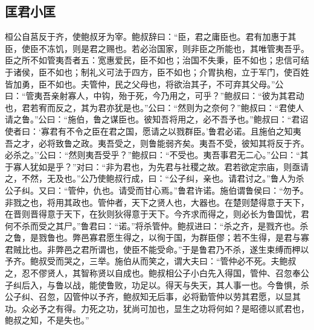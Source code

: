 \documentclass[]{article}
\begin{document}
\hypertarget{header-n340}{%
\subsection{匡君小匡}\label{header-n340}}

桓公自莒反于齐，使鲍叔牙为宰。鲍叔辞曰：``臣，君之庸臣也。君有加惠于其臣，使臣不冻饥，则是君之赐也。若必治国家，则非臣之所能也，其唯管夷吾乎。臣之所不如管夷吾者五：宽惠爱民，臣不如也；治国不失秉，臣不如也；忠信可结于诸侯，臣不如也；制礼义可法于四方，臣不如也；介胃执枹，立于军门，使百姓皆加勇，臣不如也。夫管仲，民之父母也，将欲治其子，不可弃其父母。''公曰：``管夷吾亲射寡人，中钩，殆于死，今乃用之，可乎？''鲍叔曰：``彼为其君动也，君若宥而反之，其为君亦犹是也。''公曰：``然则为之奈何？''鲍叔曰：``君使人请之鲁。''公曰：``施伯，鲁之谋臣也。彼知吾将用之，必不吾予也。''鲍叔曰：``君诏使者曰：`寡君有不令之臣在君之国，愿请之以戮群臣。'鲁君必诺。且施伯之知夷吾之才，必将致鲁之政。夷吾受之，则鲁能弱齐矣。夷吾不受，彼知其将反于齐。必杀之。''公曰：``然则夷吾受乎？''鲍叔曰：``不受也。夷吾事君无二心。''公曰：``其于寡人犹如是乎？''对曰：``非为君也，为先君与社稷之故。君若欲定宗庙，则亟请之，不然，无及也。''公乃使鲍叔行成，曰：``公子纠，亲也。请君讨之。''鲁人为杀公子纠。又曰：``管仲，仇也。请受而甘心焉。''鲁君许诺。施伯谓鲁侯曰：``勿予。非戮之也，将用其政也。管仲者，天下之贤人也，大器也。在楚则楚得意于天下，在晋则晋得意于天下，在狄则狄得意于天下。今齐求而得之，则必长为鲁国忧，君何不杀而受之其尸。''鲁君曰：``诺。''将杀管仲。鲍叔进曰：``杀之齐，是戮齐也。杀之鲁，是戮鲁也。弊邑寡君愿生得之，以徇于国，为群臣僇；若不生得，是君与寡君贼比也。非弊邑之君所谓也，使臣不能受命。''于是鲁君乃不杀，遂生束缚而柙以予齐。鲍叔受而哭之，三举。施伯从而笑之，谓大夫曰：``管仲必不死。夫鲍叔之，忍不僇贤人，其智称贤以自成也。鲍叔相公子小白先入得国，管仲、召忽奉公子纠后入，与鲁以战，能使鲁败，功足以。得天与失天，其人事一也。今鲁惧，杀公子纠、召忽，囚管仲以予齐，鲍叔知无后事，必将勤管仲以劳其君愿，以显其功。众必予之有得。力死之功，犹尚可加也，显生之功将何如？是昭德以贰君也，鲍叔之知，不是失也。''
\end{document}
